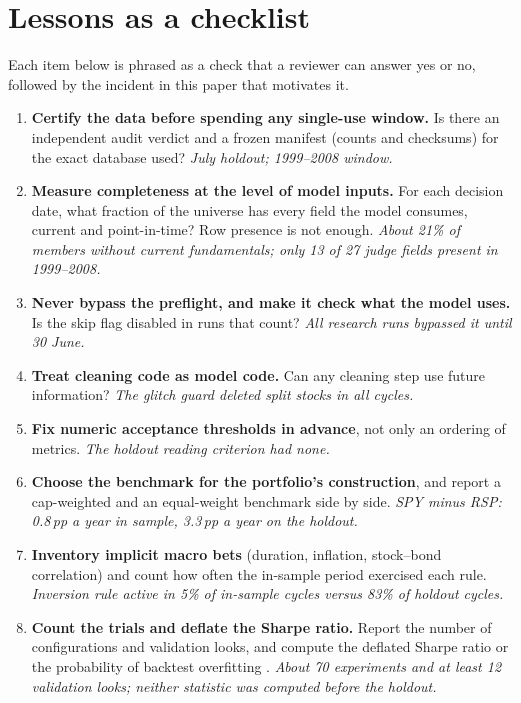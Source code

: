 \documentclass[11pt]{article}
\begin{document}
\section{Lessons as a checklist}\label{sec:lessons}

Each item below is phrased as a check that a reviewer can answer yes or no, followed by the incident in this paper that motivates it.

\begin{enumerate}[leftmargin=*,itemsep=2pt]
\item \textbf{Certify the data before spending any single-use window.} Is there an independent audit verdict and a frozen manifest (counts and checksums) for the exact database used? \emph{July holdout; 1999--2008 window.}
\item \textbf{Measure completeness at the level of model inputs.} For each decision date, what fraction of the universe has every field the model consumes, current and point-in-time? Row presence is not enough. \emph{About 21\% of members without current fundamentals; only 13 of 27 judge fields present in 1999--2008.}
\item \textbf{Never bypass the preflight, and make it check what the model uses.} Is the skip flag disabled in runs that count? \emph{All research runs bypassed it until 30 June.}
\item \textbf{Treat cleaning code as model code.} Can any cleaning step use future information? \emph{The glitch guard deleted split stocks in all cycles.}
\item \textbf{Fix numeric acceptance thresholds in advance}, not only an ordering of metrics. \emph{The holdout reading criterion had none.}
\item \textbf{Choose the benchmark for the portfolio's construction}, and report a cap-weighted and an equal-weight benchmark side by side. \emph{SPY minus RSP: 0.8\,pp a year in sample, 3.3\,pp a year on the holdout.}
\item \textbf{Inventory implicit macro bets} (duration, inflation, stock--bond correlation) and count how often the in-sample period exercised each rule. \emph{Inversion rule active in 5\% of in-sample cycles versus 83\% of holdout cycles.}
\item \textbf{Count the trials and deflate the Sharpe ratio.} Report the number of configurations and validation looks, and compute the deflated Sharpe ratio or the probability of backtest overfitting \citep{BaileyLopezDePrado2014,BaileyEtAl2017PBO}. \emph{About 70 experiments and at least 12 validation looks; neither statistic was computed before the holdout.}

\end{enumerate}
\end{document}
